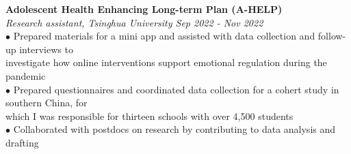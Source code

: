 \documentclass[a4paper, 10pt]{article}
\begin{document}

\pagebreak

\textbf{Adolescent Health Enhancing Long-term Plan (A-HELP)} \\ 
\textit{Research assistant, Tsinghua University \hfill Sep 2022 - Nov 2022} \\
$\bullet$\hspace{1.8em} Prepared materials for a mini app and assisted with data collection and follow-up interviews to  \\ \indent\hspace{2.3em} investigate how online interventions support emotional regulation during the pandemic \\
$\bullet$\hspace{1.8em} Prepared questionnaires and coordinated data collection for a cohert study in southern China, for  \\ \indent\hspace{2.3em} which I was responsible for thirteen schools with over 4,500 students \\
$\bullet$\hspace{1.8em} Collaborated with postdocs on research by contributing to data analysis and drafting \\

\bigskip




\end{document}
